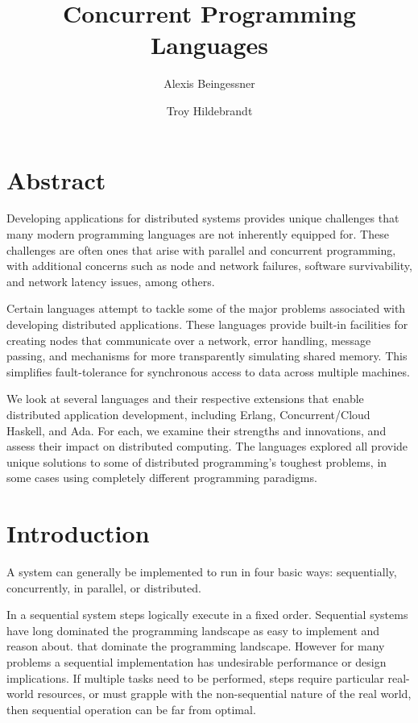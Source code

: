 \documentclass[10pt,a4paper,twocolumn]{article}
\begin{document}
\title{Concurrent Programming Languages}

\author{
Alexis Beingessner
\and
Troy Hildebrandt
}

\maketitle

\section{Abstract}

Developing applications for distributed systems provides unique challenges that
many modern programming languages are not inherently equipped for. These
challenges are often ones that arise with parallel and concurrent programming,
with additional concerns such as node and network failures, software
survivability, and network latency issues, among others.

Certain languages attempt to tackle some of the major problems associated with
developing distributed applications. These languages provide built-in facilities
for creating nodes that communicate over a network, error handling, message
passing, and mechanisms for more transparently simulating shared memory. This
simplifies fault-tolerance for synchronous access to data across multiple
machines.

We look at several languages and their respective extensions that enable
distributed application development, including Erlang, Concurrent/Cloud Haskell,
and Ada. For each, we examine their strengths and innovations, and assess their
impact on distributed computing. The languages explored all provide unique
solutions to some of distributed programming's toughest problems, in some cases
using completely different programming paradigms.

\section{Introduction}

A system can generally be implemented to run in four basic ways:
sequentially, concurrently, in parallel, or distributed.

In a sequential system steps logically execute in a fixed order. Sequential
systems have long dominated the programming landscape as easy to implement and
reason about.  that dominate the programming landscape. However for many
problems a sequential implementation has undesirable performance or design
implications. If multiple tasks need to be performed, steps require particular
real-world resources, or must grapple with the non-sequential nature of the real
world, then sequential operation can be far from optimal.
\end{document}
